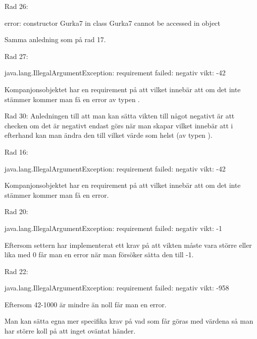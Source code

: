 Rad 26:
\begin{REPL}
	error: constructor Gurka7 in class Gurka7 cannot be accessed in object
\end{REPL}
Samma anledning som på rad 17.

Rad 27:
\begin{REPL}
	java.lang.IllegalArgumentException: requirement failed: negativ vikt: -42
\end{REPL}
Kompanjonsobjektet har en requirement på att  vilket innebär att om det inte stämmer kommer man få en error av typen .

Rad 30: Anledningen till att man kan sätta vikten till något negativt är att checken om det är negativt endast görs när man skapar  vilket innebär att i efterhand kan man ändra den till vilket värde som helst (av typen ).

\Task %

\Subtask Rad 16:
\begin{REPL}
	java.lang.IllegalArgumentException: requirement failed: negativ vikt: -42
\end{REPL}
Kompanjonsobjektet har en requirement på att  vilket innebär att om det inte stämmer kommer man få en error.

Rad 20:
\begin{REPL}
	java.lang.IllegalArgumentException: requirement failed: negativ vikt: -1
\end{REPL}
Eftersom settern har implementerat ett krav på att vikten måste vara större eller lika med 0 får man en error när man försöker sätta den till -1.

Rad 22:
\begin{REPL}
	java.lang.IllegalArgumentException: requirement failed: negativ vikt: -958
\end{REPL}
Eftersom 42-1000 är mindre än noll får man en error.

\Subtask Man kan sätta egna mer specifika krav på vad som får göras med värdena så man har större koll på att inget oväntat händer.

\Task {}

